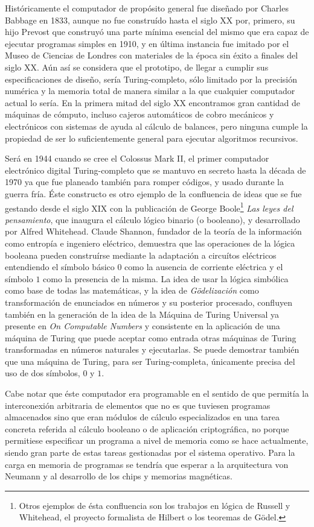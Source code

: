 \documentclass[12pt]{memoir}
\begin{document}
Históricamente el computador de propósito general fue diseñado por Charles Babbage en 1833, aunque no fue construído hasta el siglo XX por, primero, su hijo Prevost que construyó una parte mínima esencial del mismo que era capaz de ejecutar programas simples en 1910, y en última instancia fue imitado por el Museo de Ciencias de Londres con materiales de la época sin éxito a finales del siglo XX. Aún así se considera que el prototipo, de llegar a cumplir sus especificaciones de diseño, sería Turing-completo, sólo limitado por la precisión numérica y la memoria total de manera similar a la que cualquier computador actual lo sería. En la primera mitad del siglo XX encontramos gran cantidad de máquinas de cómputo, incluso cajeros automáticos de cobro mecánicos y electrónicos con sistemas de ayuda al cálculo de balances, pero ninguna cumple la propiedad de ser lo suficientemente general para ejecutar algoritmos recursivos.

Será en 1944 cuando se cree el Colossus Mark II, el primer computador electrónico digital Turing-completo que se mantuvo en secreto hasta la década de 1970 ya que fue planeado también para romper códigos, y usado durante la guerra fría. Éste constructo es otro ejemplo de la confluencia de ideas que se fue gestando desde el siglo XIX con la publicación de George Boole\footnote{Otros ejemplos de ésta confluencia son los trabajos en lógica de Russell y Whitehead, el proyecto formalista de Hilbert o los teoremas de Gödel.} \textit{Las leyes del pensamiento}, que inaugura el cálculo lógico binario (o booleano), y desarrollado por Alfred Whitehead. Claude Shannon, fundador de la teoría de la información como entropía e ingeniero eléctrico, demuestra que las operaciones de la lógica booleana pueden construírse mediante la adaptación a circuítos eléctricos entendiendo el símbolo básico $0$ como la ausencia de corriente eléctrica y el símbolo $1$ como la presencia de la misma. La idea de usar la lógica simbólica como base de todas las matemáticas, y la idea de \textit{Gödelización} como transformación de enunciados en números y su posterior procesado, confluyen también en la generación de la idea de la Máquina de Turing Universal ya presente en \textit{On Computable Numbers} y consistente en la aplicación de una máquina de Turing que puede aceptar como entrada otras máquinas de Turing transformadas en números naturales y ejecutarlas. Se puede demostrar también que una máquina de Turing, para ser Turing-completa, únicamente precisa del uso de dos símbolos, $0$ y $1$. 

Cabe notar que éste computador era programable en el sentido de que permitía la interconexión arbitraria de elementos que no es que tuviesen programas almacenados sino que eran módulos de cálculo especializados en una tarea concreta referida al cálculo booleano o de aplicación criptográfica, no porque permitiese especificar un programa a nivel de memoria como se hace actualmente, siendo gran parte de estas tareas gestionadas por el sistema operativo. Para la carga en memoria de programas se tendría que esperar a la arquitectura von Neumann y al desarrollo de los chips y memorias magnéticas.
\end{document}
